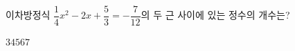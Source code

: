 이차방정식 $\dfrac{1}{4}x^2-2x+\dfrac{5}{3}=-\dfrac{7}{12}$의 두 근 사이에 있는 정수의 개수는?
\begin{choices32}{$3$}{$4$}{$5$}{$6$}{$7$}\end{choices32}
